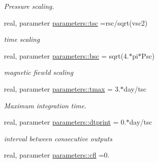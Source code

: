 \begin{DoxyCompactItemize}
\begin{DoxyCompactList}\small\item\em Pressure scaling. \end{DoxyCompactList}\item 
\hypertarget{namespaceparameters_a3986a90c2750989207cff0593c325ce1}{}real, parameter \hyperlink{namespaceparameters_a3986a90c2750989207cff0593c325ce1}{parameters\+::tsc} =rsc/sqrt(vsc2)\label{namespaceparameters_a3986a90c2750989207cff0593c325ce1}

\begin{DoxyCompactList}\small\item\em time scaling \end{DoxyCompactList}\item 
\hypertarget{namespaceparameters_a8b8971e5b07f3249e787d4a06461f9db}{}real, parameter \hyperlink{namespaceparameters_a8b8971e5b07f3249e787d4a06461f9db}{parameters\+::bsc} = sqrt(4.$\ast$pi$\ast$Psc)\label{namespaceparameters_a8b8971e5b07f3249e787d4a06461f9db}

\begin{DoxyCompactList}\small\item\em magnetic fiewld scaling \end{DoxyCompactList}\item 
\hypertarget{namespaceparameters_a32153ac2f0853357f00212ed40525b85}{}real, parameter \hyperlink{namespaceparameters_a32153ac2f0853357f00212ed40525b85}{parameters\+::tmax} = 3.$\ast$day/tsc\label{namespaceparameters_a32153ac2f0853357f00212ed40525b85}

\begin{DoxyCompactList}\small\item\em Maximum integration time. \end{DoxyCompactList}\item 
\hypertarget{namespaceparameters_aa82f078b9d5e200c98460fd8fdecd77f}{}real, parameter \hyperlink{namespaceparameters_aa82f078b9d5e200c98460fd8fdecd77f}{parameters\+::dtprint} = 0.$\ast$day/tsc\label{namespaceparameters_aa82f078b9d5e200c98460fd8fdecd77f}

\begin{DoxyCompactList}\small\item\em interval between consecutive outputs \end{DoxyCompactList}\item 
\hypertarget{namespaceparameters_a10cf58c7e097b82e96d1c149530dad37}{}real, parameter \hyperlink{namespaceparameters_a10cf58c7e097b82e96d1c149530dad37}{parameters\+::cfl} =0.\label{namespaceparameters_a10cf58c7e097b82e96d1c149530dad37}


\end{DoxyCompactItemize}
